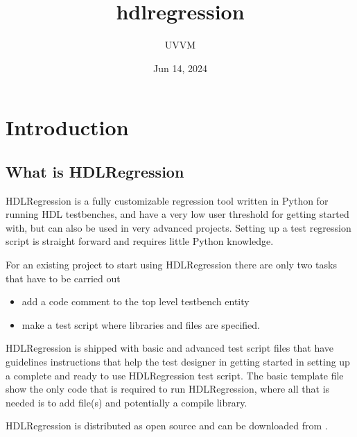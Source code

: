 \documentclass[letterpaper,10pt,english]{sphinxmanual}
\title{hdlregression}
\date{Jun 14, 2024}
\author{UVVM}
\begin{document}
\pagestyle{empty}
\sphinxmaketitle
\pagestyle{plain}
\sphinxtableofcontents
\pagestyle{normal}
\label{\detokenize{index::doc}}



\chapter{Introduction}
\label{\detokenize{intro:introduction}}\label{\detokenize{intro::doc}}

\section{What is HDLRegression}
\label{\detokenize{intro:what-is-hdlregression}}
\sphinxAtStartPar
HDLRegression is a fully customizable regression tool written in Python for running HDL testbenches, and have a
very low user threshold for getting started with, but can also be used in very advanced projects.
Setting up a test regression script is straight forward and requires little Python knowledge.

\sphinxAtStartPar
For an existing project to start using HDLRegression there are only two tasks that have to be carried out
\begin{itemize}
\item {} 
 \sphinxhyphen{} add a code comment to the top level testbench entity

\item {} 
 \sphinxhyphen{} make a test script where libraries and files are specified.

\end{itemize}

\sphinxAtStartPar
HDLRegression is shipped with basic and advanced test script {\hyperref[\detokenize{templates::doc}]{}} files that have guidelines instructions that help the
test designer in getting started in setting up a complete and ready to use HDLRegression test script.
The basic template file show the only code that is required to run HDLRegression, where all that is needed is to add file(s)
and potentially a compile library.

\sphinxAtStartPar
HDLRegression is distributed as open source and can be downloaded from .
\end{document}
